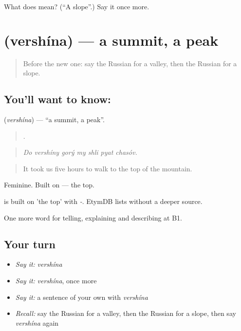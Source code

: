 \begin{tcolorbox}[breakable,colback=teal!4,colframe=teal!35!black,title={Before you move on}]
What does  mean? (\textquotedblleft{}A slope\textquotedblright{}.) Say it once more.
\end{tcolorbox}
\section[\texorpdfstring{\ru{вершина} (vershína)}{вершина (vershína)}]{ (vershína) — a summit, a peak}

\label{lesson:RU-C458-vershina}



\begin{quote}
Before the new one: say the Russian for a valley, then the Russian for a slope.
\end{quote}

\subsection*{You'll want to know: }
\textbf{} (\emph{vershína}) — \textquotedblleft{}a summit, a peak\textquotedblright{}.

\begin{quote}
      .
\end{quote}

\begin{quote}
\emph{Do vershíny gorý my shli pyat chasóv.}
\end{quote}

\begin{quote}
It took us five hours to walk to the top of the mountain.
\end{quote}

Feminine. Built on \emph{} — the top.

\begin{cousinweb}
\emph{} is built on \emph{} 'the top' with \emph{-}. EtymDB lists \emph{} without a deeper source.
\end{cousinweb}

\begin{grammarlens}[title={What you've built}]
One more word for telling, explaining and describing at B1.
\end{grammarlens}

\subsection*{Your turn}
\begin{itemize}
\raggedright
  \item \emph{Say it:} \emph{vershína}
  \item \emph{Say it:} \emph{vershína}, once more
  \item \emph{Say it:} a sentence of your own with \emph{vershína}
  \item \emph{Recall:} say the Russian for a valley, then the Russian for a slope, then say \emph{vershína} again
\end{itemize}

